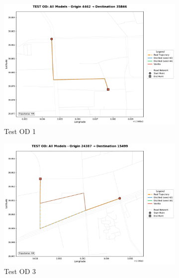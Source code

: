 \begin{figure}[H]
    \centering
    \begin{subfigure}{0.49\linewidth}
        \centering
        \includegraphics[width=\linewidth]{assets/plots/eval/beijing/cross_model/test_od_comparison_1_origin4462_dest35846.pdf}
        \caption{Test OD 1}
    \end{subfigure}
    \begin{subfigure}{0.49\linewidth}
        \centering
        \includegraphics[width=\linewidth]{assets/plots/eval/beijing/cross_model/test_od_comparison_3_origin24387_dest15499.pdf}
        \caption{Test OD 3}
    \end{subfigure}
    \begin{subfigure}{0.49\linewidth}
        \centering

\end{subfigure}
\end{figure}
